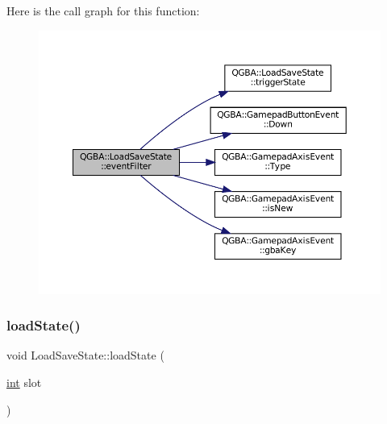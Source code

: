 Here is the call graph for this function\+:
\nopagebreak
\begin{figure}[H]
\begin{center}
\leavevmode
\includegraphics[width=350pt]{class_q_g_b_a_1_1_load_save_state_ad80e912f91cfa7693004fb0d2d5ea409_cgraph}
\end{center}
\end{figure}
\mbox{\label{class_q_g_b_a_1_1_load_save_state_a4c71c3b9021b90dc593df29b6aab1676}} 
\subsubsection{\texorpdfstring{load\+State()}{loadState()}}
{\footnotesize\ttfamily void Load\+Save\+State\+::load\+State (\begin{DoxyParamCaption}\item[{\mbox{\hyperlink{ioapi_8h_a787fa3cf048117ba7123753c1e74fcd6}{int}}}]{slot }\end{DoxyParamCaption})\hspace{0.3cm}{\ttfamily [private]}}

